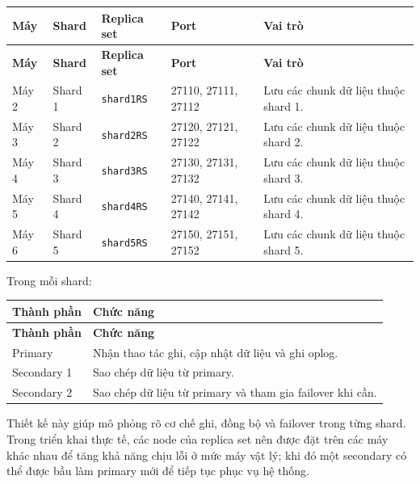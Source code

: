\documentclass[12pt,a4paper]{article}
\begin{document}
\begin{center}
\small
\begin{longtable}{|p{1.4cm}|p{1.5cm}|p{2.1cm}|p{2.5cm}|p{4.2cm}|}
\hline
\textbf{Máy} & \textbf{Shard} & \textbf{Replica set} & \textbf{Port} & \textbf{Vai trò} \\ \hline
\endfirsthead
\hline
\textbf{Máy} & \textbf{Shard} & \textbf{Replica set} & \textbf{Port} & \textbf{Vai trò} \\ \hline
\endhead
Máy 2 & Shard 1 & \texttt{shard1RS} & 27110, 27111, 27112 & Lưu các chunk dữ liệu thuộc shard 1. \\ \hline
Máy 3 & Shard 2 & \texttt{shard2RS} & 27120, 27121, 27122 & Lưu các chunk dữ liệu thuộc shard 2. \\ \hline
Máy 4 & Shard 3 & \texttt{shard3RS} & 27130, 27131, 27132 & Lưu các chunk dữ liệu thuộc shard 3. \\ \hline
Máy 5 & Shard 4 & \texttt{shard4RS} & 27140, 27141, 27142 & Lưu các chunk dữ liệu thuộc shard 4. \\ \hline
Máy 6 & Shard 5 & \texttt{shard5RS} & 27150, 27151, 27152 & Lưu các chunk dữ liệu thuộc shard 5. \\ \hline
\end{longtable}
\normalsize
\end{center}

Trong mỗi shard:

\begin{center}
\small
\begin{longtable}{|p{3cm}|p{9cm}|}
\hline
\textbf{Thành phần} & \textbf{Chức năng} \\ \hline
\endfirsthead
\hline
\textbf{Thành phần} & \textbf{Chức năng} \\ \hline
\endhead
Primary & Nhận thao tác ghi, cập nhật dữ liệu và ghi oplog. \\ \hline
Secondary 1 & Sao chép dữ liệu từ primary. \\ \hline
Secondary 2 & Sao chép dữ liệu từ primary và tham gia failover khi cần. \\ \hline
\end{longtable}
\normalsize
\end{center}

Thiết kế này giúp mô phỏng rõ cơ chế ghi, đồng bộ và failover trong từng shard. Trong triển khai thực tế, các node của replica set nên được đặt trên các máy khác nhau để tăng khả năng chịu lỗi ở mức máy vật lý; khi đó một secondary có thể được bầu làm primary mới để tiếp tục phục vụ hệ thống.
\end{document}
